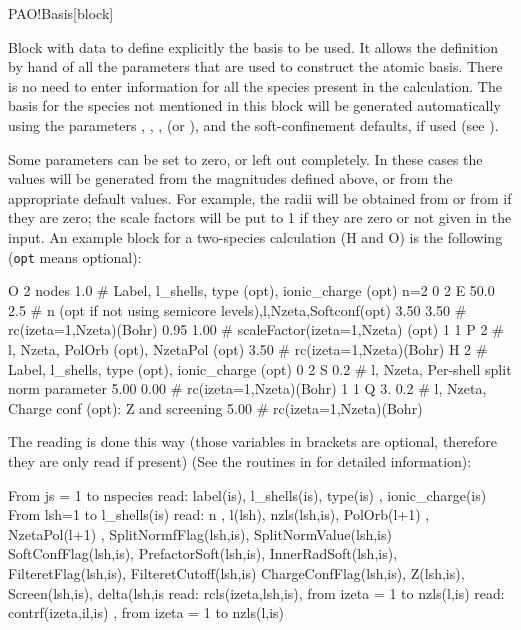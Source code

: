 \begin{fdfentry}{PAO!Basis}[block]

  Block with data to define explicitly the basis to be used.  It
  allows the definition by hand of all the parameters that are used to
  construct the atomic basis. There is no need to enter information
  for all the species present in the calculation. The
  basis for the species not mentioned in this block
  will be generated automatically using the parameters
  , , ,
   (or ), and the
  soft-confinement defaults, if used (see ).

  Some parameters can be set to zero, or left out completely.  In
  these cases the values will be generated from the magnitudes defined
  above, or from the appropriate default values. For example, the
  radii will be obtained from
   or from  if they are
  zero; the scale factors will be put to 1 if they are zero or not
  given in the input.  An example block for a two-species calculation
  (H and O) is the following (\texttt{opt} means optional):
  
  \begin{fdfexample}
O    2  nodes  1.0   # Label, l_shells, type (opt), ionic_charge (opt)
 n=2 0 2  E 50.0 2.5 # n (opt if not using semicore levels),l,Nzeta,Softconf(opt)
     3.50  3.50      #     rc(izeta=1,Nzeta)(Bohr)
     0.95  1.00      #     scaleFactor(izeta=1,Nzeta) (opt)
     1 1  P 2        # l, Nzeta, PolOrb (opt), NzetaPol (opt)
     3.50            #     rc(izeta=1,Nzeta)(Bohr)
H    2               # Label, l_shells, type (opt), ionic_charge (opt)
     0 2 S 0.2       # l, Nzeta, Per-shell split norm parameter
     5.00  0.00      #     rc(izeta=1,Nzeta)(Bohr)
     1 1 Q 3. 0.2    # l, Nzeta, Charge conf (opt): Z and screening
     5.00            #    rc(izeta=1,Nzeta)(Bohr)
  \end{fdfexample}
   

  \noindent
  The reading is done this way (those variables in brackets are
  optional, therefore they are only read if present) (See
  the routines in  for detailed information):
  
\begin{shellexample}
    From js = 1 to  nspecies
       read: label(is), l_shells(is), { type(is) }, { ionic_charge(is) }
       From lsh=1 to l_shells(is)
        read:
         { n }, l(lsh), nzls(lsh,is), { PolOrb(l+1) }, { NzetaPol(l+1) },
         {SplitNormfFlag(lsh,is)}, {SplitNormValue(lsh,is)}
         {SoftConfFlag(lsh,is)}, {PrefactorSoft(lsh,is)}, {InnerRadSoft(lsh,is)},
         {FilteretFlag(lsh,is)}, {FilteretCutoff(lsh,is)}
         {ChargeConfFlag(lsh,is)}, {Z(lsh,is)}, {Screen(lsh,is)}, {delta(lsh,is}
           read: rcls(izeta,lsh,is), from izeta = 1 to nzls(l,is)
           read: { contrf(izeta,il,is) }, from izeta = 1 to nzls(l,is)
\end{shellexample}


\end{fdfentry}
